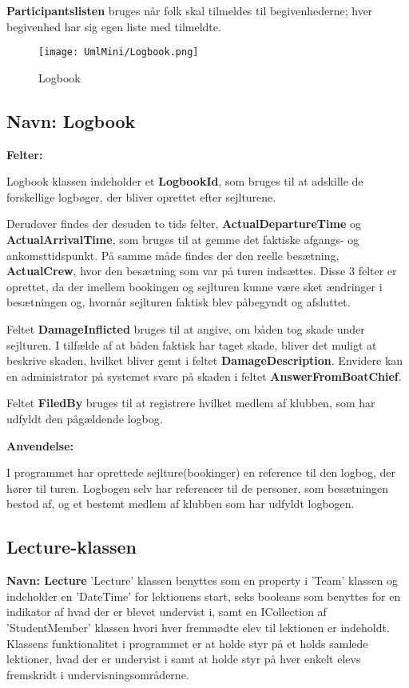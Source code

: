 \textbf{Participantslisten} bruges når folk skal tilmeldes til begivenhederne; hver begivenhed har sig egen liste med tilmeldte. 

\begin{wrapfigure}[9]{R}{0.37\textwidth}
    \label{img:logbook}
    \vspace{-20pt}
    \begin{center}
        \texttt{[image: UmlMini/Logbook.png]}
    \end{center}
    \vspace{-10pt}
    \caption{Logbook}
\end{wrapfigure}
\subsection*{Navn: Logbook}

\textbf{Felter:}

Logbook klassen indeholder et \textbf{LogbookId}, som bruges til at adskille de forskellige logbøger, der bliver oprettet efter sejlturene. 

Derudover findes der desuden to tids felter, \textbf{ActualDepartureTime} og \textbf{ActualArrivalTime}, som bruges til at gemme det faktiske afgangs- og ankomsttidspunkt. 
På samme måde findes der den reelle besætning, \textbf{ActualCrew}, hvor den besætning som var på turen indsættes. 
Disse 3 felter er oprettet, da der imellem bookingen og sejlturen kunne være sket ændringer i besætningen og, hvornår sejlturen faktisk blev påbegyndt og afsluttet. 

Feltet \textbf{DamageInflicted} bruges til at angive, om båden tog skade under sejlturen. I tilfælde af at båden faktisk har taget skade, bliver det muligt at beskrive skaden, hvilket bliver gemt i feltet \textbf{DamageDescription}.
Envidere kan en administrator på systemet svare på skaden i feltet \textbf{AnswerFromBoatChief}.

Feltet \textbf{FiledBy} bruges til at registrere hvilket medlem af klubben, som har udfyldt den pågældende logbog.

\textbf{Anvendelse:}

I programmet har oprettede sejlture(bookinger) en reference til den logbog, der hører til turen.
Logbogen selv har referencer til de personer, som besætningen bestod af, og et bestemt medlem af klubben som har udfyldt logbogen.

\subsection*{Lecture-klassen}
\textbf{Navn: Lecture}
'Lecture' klassen benyttes som en property i 'Team' klassen og indeholder en 'DateTime' for lektionens start, seks booleans som benyttes for en indikator af hvad der er blevet undervist i, samt en ICollection af 'StudentMember' klassen hvori hver fremmødte elev til lektionen er indeholdt.
Klassens funktionalitet i programmet er at holde styr på et holds samlede lektioner, hvad der er undervist i samt at holde styr på hver enkelt elevs fremskridt i undervisningsområderne.


\cbend